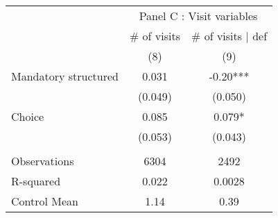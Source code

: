 \begin{tabular}{lcc}
\toprule
      & \multicolumn{2}{c}{Panel C  : Visit variables} \\
\cmidrule{2-3}      & \# of visits & \# of visits $|$ def \\
\midrule
\midrule
      & (8)   & (9) \\
\midrule
\midrule
Mandatory structured & 0.031 & -0.20*** \\
      & (0.049) & (0.050) \\
Choice  & 0.085 & 0.079* \\
      & (0.053) & (0.043) \\
      &       &  \\
\midrule
Observations & 6304  & 2492 \\
R-squared & 0.022 & 0.0028 \\
Control Mean & 1.14  & 0.39 \\
\bottomrule
\bottomrule
\end{tabular}%
